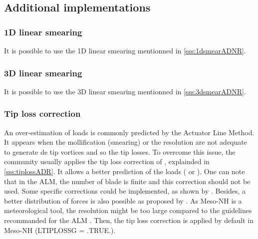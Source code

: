 \subsection{Additional implementations}
\subsubsection*{1D linear smearing}
It is possible to use the 1D linear smearing mentionned in \ref{sss:1dsmearADNR}.

\subsubsection*{3D linear smearing}
It is possible to use the 3D linear smearing mentionned in \ref{sss:3dsmearADNR}.

\subsubsection*{Tip loss correction}
\label{sss:tiplossALM}

An over-estimation of loads is commonly predicted by the Actuator Line Method. It appears when the mollification (smearing) or the resolution are not adequate to generate de tip vortices and so the tip losses. 
To overcome this issue, the community usually applies the tip loss correction of \citet{glauert1935airplane}, explainded in \ref{sss:tiplossADR}. It allows a better prediction of the loads (\citet{mikkelsen2003actuator} or \citet{shen2005tip}).
\medbreak
One can note that in the ALM, the number of blade is finite and this correction should not be used. Some specific corrections could be implemented, as shown by \citet{breton2008study}. Besides, a better distribution of forces is also possible as proposed by \citet{churchfield2017advanced}. 
As Meso-NH is a meteorological tool, the resolution might be too large compared to the guidelines recommanded for the ALM \citet{jha2014guidelines}. Then, the tip loss correction is applied by default in Meso-NH (LTIPLOSSG = .TRUE.).

